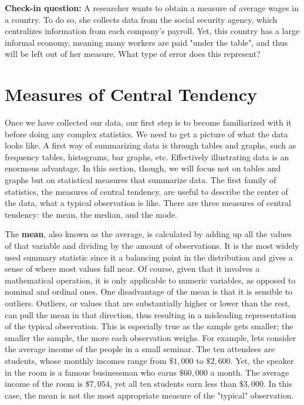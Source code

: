 \documentclass{book}
\newenvironment{shaded*}{
    \begin{center}
    \begin{tabular}{|p{0.9\textwidth}|}
    \hline\\
    }
    { 
    \\\\\hline
    \end{tabular} 
    \end{center}
}
\begin{document}
\begin{shaded*}

\textbf{Check-in question:} A researcher wants to obtain a measure of average
wages in a country. To do so, she collects data from the social security
agency, which centralizes information from each company's payroll. Yet, this
country has a large informal economy, meaning many workers are paid "under the
table", and thus will be left out of her measure. What type of error does this
represent?

\end{shaded*}

\hypertarget{measures-of-central-tendency}{%
\section{Measures of Central Tendency}\label{measures-of-central-tendency}}

Once we have collected our data, our first step is to become familiarized with
it before doing any complex statistics. We need to get a picture of what the
data looks like. A first way of summarizing data is through tables and graphs,
such as frequency tables, histograms, bar graphs, etc. Effectively
illustrating data is an enormous advantage. In this section, though, we will
focus not on tables and graphs but on statistical measures that summarize
data. The first family of statistics, the measures of central tendency, are
useful to describe the center of the data, what a typical observation is like.
There are three measures of central tendency: the mean, the median, and the
mode.

The \textbf{mean}, also known as the average, is calculated by adding up all
the values of that variable and dividing by the amount of observations. It is
the most widely used summary statistic since it a balancing point in the
distribution and gives a sense of where most values fall near. Of course,
given that it involves a mathematical operation, it is only applicable to
numeric variables, as opposed to nominal and ordinal ones. One disadvantage of
the mean is that it is sensible to outliers. Outliers, or values that are
substantially higher or lower than the rest, can pull the mean in that
direction, thus resulting in a misleading representation of the typical
observation. This is especially true as the sample gets smaller; the smaller
the sample, the more each observation weighs. For example, lets consider the
average income of the people in a small seminar. The ten attendees are
students, whose monthly incomes range from \(\$1,000\) to \(\$2,600\). Yet,
the speaker in the room is a famous businessman who earns \(\$60,000\) a
month. The average income of the room is \(\$7,054\), yet all ten students
earn less than \(\$3,000\). In this case, the mean is not the most appropriate
measure of the "typical" observation.
\end{document}
